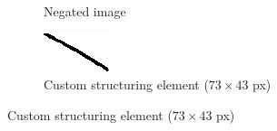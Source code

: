 \documentclass[a4paper]{article}
\begin{document}
\begin{figure}[htp]
\begin{subfigure}{.33\textwidth}
  \caption{Negated image}
\end{subfigure}
\begin{subfigure}{.33\textwidth}
  \centering
  \includegraphics[width=.5\linewidth]{kernelex}
  \caption{Custom structuring element ($73\times43$ px)}
\end{subfigure}
\captionsetup{format=empty}
\end{figure}
\begin{figure}[htp]


\end{figure}
\end{document}
